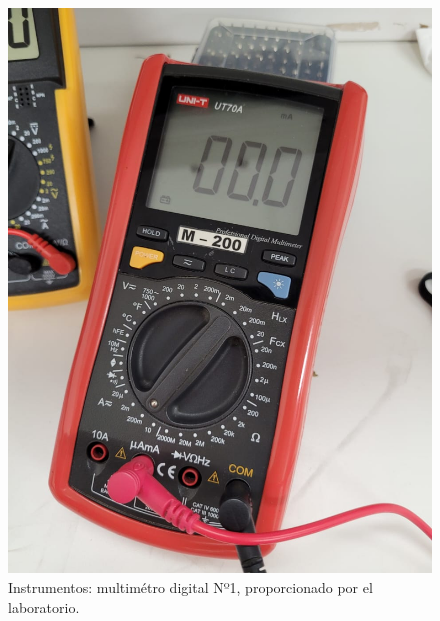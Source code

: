 \documentclass[chaptersright]{informeutn}
\begin{document}
\begin{figure}[h!]
\begin{minipage}{0.3\textwidth}
            \includegraphics[width=\textwidth]{pictures/multimetro-facu.jpeg}
            \caption{Instrumentos: multimétro digital Nº1, proporcionado por el laboratorio.}
        \end{minipage}
    \end{figure}
\end{document}
